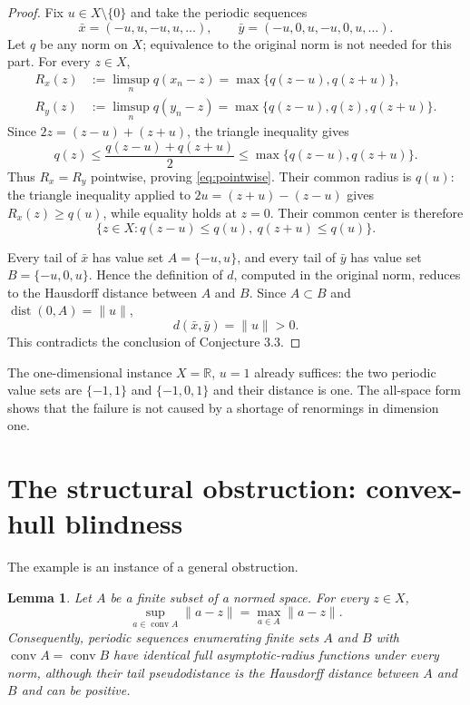 \documentclass[11pt]{article}
\newtheorem{lemma}{Lemma}
\newcommand{\conv}{\operatorname{conv}}
\begin{document}
\begin{proof}
Fix $u\in X\setminus\{0\}$ and take the periodic sequences
\[
 \bar x=(-u,u,-u,u,\ldots),
 \qquad
 \bar y=(-u,0,u,-u,0,u,\ldots).
\]
Let $q$ be any norm on $X$; equivalence to the original norm is not needed for
this part.  For every $z\in X$,
\begin{align*}
 R_x(z)&:=\limsup_n q(x_n-z)=\max\{q(z-u),q(z+u)\},\\
 R_y(z)&:=\limsup_n q(y_n-z)=\max\{q(z-u),q(z),q(z+u)\}.
\end{align*}
Since $2z=(z-u)+(z+u)$, the triangle inequality gives
\[
 q(z)\le\frac{q(z-u)+q(z+u)}2
 \le\max\{q(z-u),q(z+u)\}.
\]
Thus $R_x=R_y$ pointwise, proving \eqref{eq:pointwise}.  Their common radius
is $q(u)$: the triangle inequality applied to
$2u=(z+u)-(z-u)$ gives $R_x(z)\ge q(u)$, while equality holds at $z=0$.
Their common center is therefore
\[
 \{z\in X:q(z-u)\le q(u),\ q(z+u)\le q(u)\}.
\]

Every tail of $\bar x$ has value set $A=\{-u,u\}$, and every tail of
$\bar y$ has value set $B=\{-u,0,u\}$.  Hence the definition of $d$, computed
in the original norm, reduces to the Hausdorff distance between $A$ and $B$.
Since $A\subset B$ and $\operatorname{dist}(0,A)=\|u\|$,
\[
 d(\bar x,\bar y)=\|u\|>0.
\]
This contradicts the conclusion of Conjecture 3.3.
\end{proof}

The one-dimensional instance $X=\mathbb R$, $u=1$ already suffices: the two
periodic value sets are $\{-1,1\}$ and $\{-1,0,1\}$ and their distance is one.
The all-space form shows that the failure is not caused by a shortage of
renormings in dimension one.

\section*{The structural obstruction: convex-hull blindness}

The example is an instance of a general obstruction.

\begin{lemma}\label{lem:hull}
Let $A$ be a finite subset of a normed space.  For every $z\in X$,
\[
 \sup_{a\in\conv A}\|a-z\|=\max_{a\in A}\|a-z\|.
\]
Consequently, periodic sequences enumerating finite sets $A$ and $B$ with
$\conv A=\conv B$ have identical full asymptotic-radius functions under every
norm, although their tail pseudodistance is the Hausdorff distance between
$A$ and $B$ and can be positive.
\end{lemma}
\end{document}
